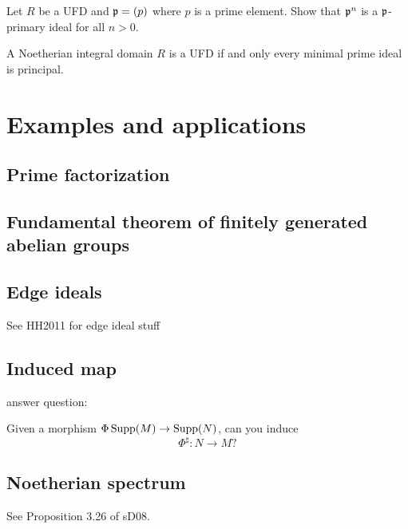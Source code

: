 \documentclass{ximera}
\begin{document}
\begin{exercise}
  Let $R$ be a UFD and $\mathfrak{p} = (p)$ where $p$ is a prime element. Show
  that $\mathfrak{p}^n$ is a $\mathfrak{p}$-primary ideal for all $n>0$.
\end{exercise}





\begin{proposition}%
   A Noetherian integral domain $R$ is a UFD if and only every minimal
   prime ideal is principal.
\end{proposition}



\section{Examples and applications}

\subsection{Prime factorization}

\subsection{Fundamental theorem of finitely generated abelian groups}


\subsection{Edge ideals} %

See HH2011 for edge ideal stuff


\subsection{Induced map}


answer question:

  Given a morphism $\Phi\operatorname{Supp}(M) \to \operatorname{Supp}(N)$, can you induce
  \[
  \Phi^\sharp : N\to M?
  \]

\subsection{Noetherian spectrum}

See Proposition 3.26 of sD08.
\end{document}
